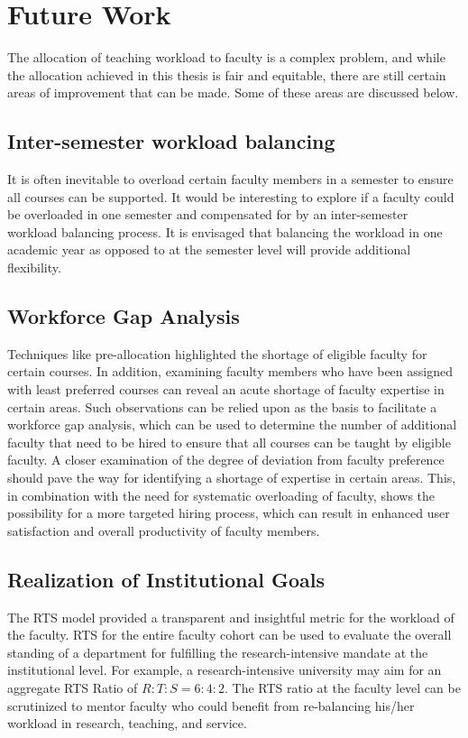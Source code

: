\section{Future Work}

The allocation of teaching workload to faculty is a complex problem, and while the allocation achieved in this thesis is fair and equitable, there are still certain areas of improvement that can be made. Some of these areas are discussed below.

\subsection{Inter-semester workload balancing}

It is often inevitable to overload certain faculty members in a semester to ensure all courses can be supported. It would be interesting to explore if a faculty could be overloaded in one semester and compensated for by an inter-semester workload balancing process. It is envisaged that balancing the workload in one academic year as opposed to at the semester level will provide additional flexibility.

\subsection{Workforce Gap Analysis}

Techniques like pre-allocation highlighted the shortage of eligible faculty for certain courses. In addition, examining faculty members who have been assigned with least preferred courses can reveal an acute shortage of faculty expertise in certain areas. Such observations can be relied upon as the basis to facilitate a workforce gap analysis, which can be used to determine the number of additional faculty that need to be hired to ensure that all courses can be taught by eligible faculty. A closer examination of the degree of deviation from faculty preference should pave the way for identifying a shortage of expertise in certain areas. This, in combination with the need for systematic overloading of faculty, shows the possibility for a more targeted hiring process, which can result in enhanced user satisfaction and overall productivity of faculty members.

\subsection{Realization of Institutional Goals}

The RTS model provided a transparent and insightful metric for the workload of the faculty. RTS for the entire faculty cohort can be used to evaluate the overall standing of a department for fulfilling the research-intensive mandate at the institutional level. For example, a research-intensive university may aim for an aggregate RTS Ratio of $R:T:S = 6:4:2$. The RTS ratio at the faculty level can be scrutinized to mentor faculty who could benefit from re-balancing his/her workload in research, teaching, and service.

